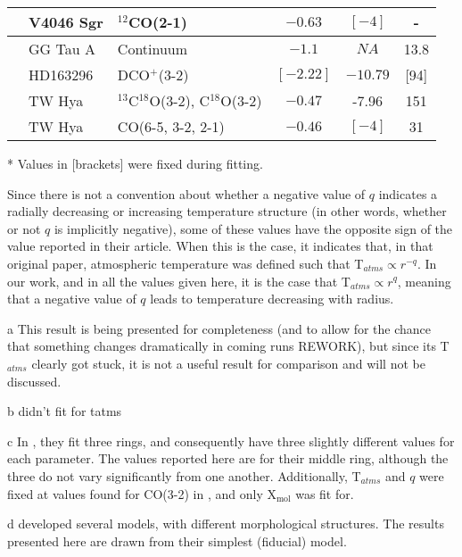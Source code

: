 \begin{table}[ht!]
\begin{threeparttable}
\begin{tabular}{l l l c c c }
      \hline
      \citet{Rosenfeld2012}\tnote{b}        & V4046 Sgr  & $^{12}$CO(2-1) & $-0.63$ & $[-4]$           & -  \\
      \hline
      \citet{Dutrey2014}        & GG Tau A  & Continuum & $-1.1$ & $NA$          & 13.8  \\
      \hline
      \citet{Flaherty2017}\tnote{c}         & HD163296   & DCO$^+$(3-2)   & $[-2.22]$ & $-10.79$      & [94]  \\
      \hline
      \citet{Zhang2017}                     & TW Hya     & $^{13}$C$^{18}$O(3-2), C$^{18}$O(3-2)  & $-0.47$ & -7.96 & 151  \\
      \hline
      \citet{Flaherty2018}\tnote{d}         & TW Hya     & CO(6-5, 3-2, 2-1) & $-0.46$ & $[-4]$       & 31  \\
      \bottomrule
    \end{tabular}
    \begin{tablenotes}\footnotesize
      \item[*] Values in [brackets] were fixed during fitting.
      \item[\dagger] Since there is not a convention about whether a negative value of $q$ indicates a radially decreasing or increasing temperature structure (in other words, whether or not $q$ is implicitly negative), some of these values have the opposite sign of the value reported in their article. When this is the case, it indicates that, in that original paper, atmospheric temperature was defined such that T$_{atms} \propto r^{-q}$. In our work, and in all the values given here, it is the case that T$_{atms} \propto r^{q}$, meaning that a negative value of $q$ leads to temperature decreasing with radius.
      \item[a] This result is being presented for completeness (and to allow for the chance that something changes dramatically in coming runs REWORK), but since its T$_{atms}$ clearly got stuck, it is not a useful result for comparison and will not be discussed.
      \item[b] \cite{Rosenfeld2012} didn't fit for tatms
      \item[c] In \citet{Flaherty2017}, they fit three rings, and consequently have three slightly different values for each parameter. The values reported here are for their middle ring, although the three do not vary significantly from one another. Additionally, T$_{atms}$ and $q$ were fixed at values found for CO(3-2) in \citet{Flaherty2015}, and only X$_\text{mol}$ was fit for.
      \item[d] \citet{Flaherty2018} developed several models, with different morphological structures. The results presented here are drawn from their simplest (fiducial) model.
    \end{tablenotes}
  \end{threeparttable}
\end{table}

